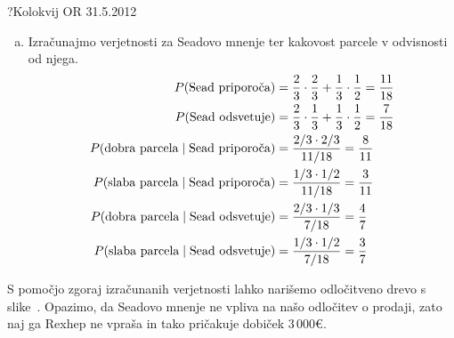 \begin{naloga}{?}{Kolokvij OR 31.5.2012}
\begin{odgovor}
\begin{enumerate}[(a)]
\item Izračunajmo verjetnosti za Seadovo mnenje
ter kakovost parcele v odvisnosti od njega.
\begin{align*}
P(\text{Sead priporoča}) &=
{2 \over 3} \cdot {2 \over 3} + {1 \over 3} \cdot {1 \over 2}
= {11 \over 18} \\
P(\text{Sead odsvetuje}) &=
{2 \over 3} \cdot {1 \over 3} + {1 \over 3} \cdot {1 \over 2}
= {7 \over 18} \\
P(\text{dobra parcela} \;|\; \text{Sead priporoča})
&= {2/3 \cdot 2/3 \over 11/18} = {8 \over 11} \\
P(\text{slaba parcela} \;|\; \text{Sead priporoča})
&= {1/3 \cdot 1/2 \over 11/18} = {3 \over 11} \\
P(\text{dobra parcela} \;|\; \text{Sead odsvetuje})
&= {2/3 \cdot 1/3 \over 7/18} = {4 \over 7} \\
P(\text{slaba parcela} \;|\; \text{Sead odsvetuje})
&= {1/3 \cdot 1/2 \over 7/18} = {3 \over 7}
\end{align*}
\end{enumerate}
S pomočjo zgoraj izračunanih verjetnosti
lahko narišemo odločitveno drevo s slike~\fig.
Opazimo, da Seadovo mnenje ne vpliva na našo odločitev o prodaji,
zato naj ga Rexhep ne vpraša in tako pričakuje dobiček $3\,000 €$.

\begin{slika}
\makebox[\textwidth][c]{
\pgfslika
}
\end{slika}
\end{odgovor}
\end{naloga}
